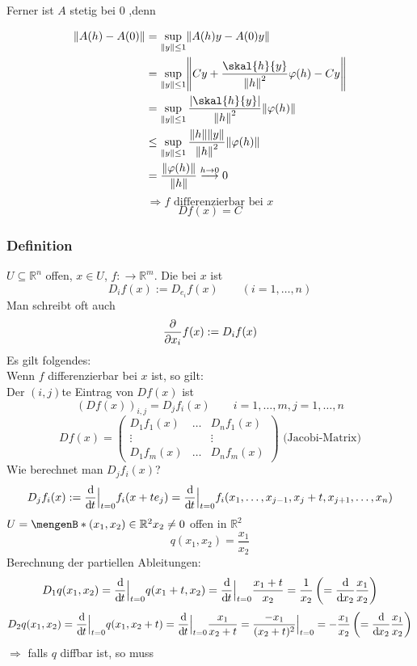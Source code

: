 Ferner ist $A$ stetig bei $0$ ,denn

\begin{align*}
	\norm{A(h)-A(0)} &= \sup\limits_{\norm{y}\leq 1} \norm{A(h)y- A(0)y} \\
			&= \sup\limits_{\norm{y}\leq 1} \norm{Cy + \frac{\skal{h}{y}}{\norm{h}^2} \varphi(h) - Cy } \\
			&= \sup\limits_{\norm{y}\leq 1} \frac{\abs{\skal{h}{y}}}{\norm{h}^2} \norm{\varphi(h)} \\
			&\leq \sup\limits_{\norm{y}\leq 1} \frac{\norm{h}\norm{y}}{\norm{h}^2} \norm{\varphi(h)} \\
			&=\frac{\norm{\varphi(h)}}{\norm{h}} \stackrel{h \to 0}{\longrightarrow} 0
\end{align*}
\[
	\Rightarrow f \text{ differenzierbar bei }x
\]
\[
	Df(x)=C
\]
\subsubsection{Definition} %
\label{ssub:definition}
$U \subseteq \mathbb{R}^n$ offen, $x \in U$, $f:  \to \mathbb{R}^m$. Die  bei $x$ ist
\[
	D_if(x):= D_{e_i}f(x) \qquad (i=1,\dots,n)
\]
Man schreibt oft auch \[
	\frac{{\partial }}{{\partial x_i}} f(x):= D_if(x)
\]
Es gilt folgendes: \\
Wenn $f$ differenzierbar bei $x$ ist, so gilt: \\
Der $(i,j)$te Eintrag von $Df(x)$ ist \[
	(Df(x))_{i,j}=D_jf_i(x) \qquad i=1,\dots,m , j=1,\dots,n
\]
\[
	Df(x)= \begin{pmatrix}
		D_1f_1(x) & \dots & D_nf_1(x) \\
		\vdots & & \vdots \\
		D_1f_m(x) & \dots & D_nf_m(x)
	\end{pmatrix} \text{ (Jacobi-Matrix)}
\]
Wie berechnet man $D_jf_i(x)$?
\[
	D_jf_i(x):=  \frac{\mathrm{d}\mkern-1.0mu }{\mathrm{d}\mkern-1.0mu t}  \Big|_{t=0}f_i(x+te_j)= \frac{\mathrm{d}\mkern-1.0mu }{\mathrm{d}\mkern-1.0mu t}  \Big|_{t=0}f_i(x_1,\dots,x_{j-1},x_j+t,x_{j+1},\dots,x_n)
\]
 $U= \set[(x_1,x_2) \in \mathbb{R}^2]{x_2 \not= 0}$ offen in $\mathbb{R}^2$ 
\[
	q(x_1,x_2)= \frac{x_1}{x_2}
\]
Berechnung der partiellen Ableitungen:
\[
	D_1q(x_1,x_2)= \frac{\mathrm{d}\mkern-1.0mu }{\mathrm{d}\mkern-1.0mu t}  \Big|_{t=0} q(x_1+t,x_2)= \frac{\mathrm{d}\mkern-1.0mu }{\mathrm{d}\mkern-1.0mu t}  \Big|_{t=0} \frac{x_1+t}{x_2} = \frac{1}{x_2} \left(= \frac{\mathrm{d}\mkern-1.0mu }{\mathrm{d}\mkern-1.0mu x_2}  \frac{x_1}{x_2} \right)
\]
\[
	D_2q(x_1,x_2)= \frac{\mathrm{d}\mkern-1.0mu }{\mathrm{d}\mkern-1.0mu t}   \Big|_{t=0} q(x_1,x_2+t)= \frac{\mathrm{d}\mkern-1.0mu }{\mathrm{d}\mkern-1.0mu t}   \Big|_{t=0} \frac{x_1}{x_2+t} = \frac{-x_1}{(x_2+t)^2}  \Big|_{t=0}^{} = - \frac{x_1}{x_2} 
	\left( = \frac{\mathrm{d}\mkern-1.0mu }{\mathrm{d}\mkern-1.0mu x_2}  \frac{x_1}{x_2}  \right)
\]
$\Rightarrow$ falls $q$ diffbar ist, so muss
